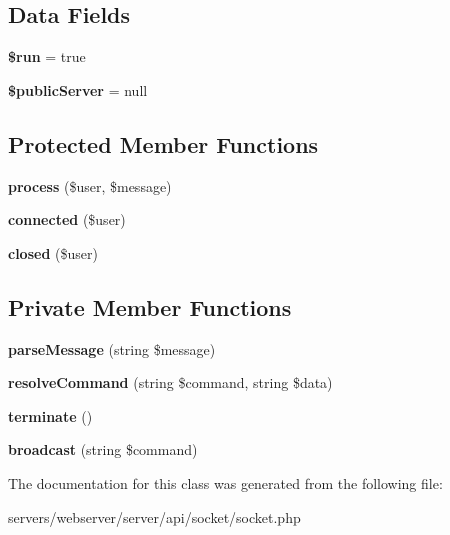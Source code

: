\subsection*{Data Fields}
\begin{DoxyCompactItemize}
\item 
\mbox{\label{class_lora_1_1_api_1_1_control_server_a1d6ddc9c52e0994f2ec85eb34cc1b1cf}} 
{\bfseries \$run} = true
\item 
\mbox{\label{class_lora_1_1_api_1_1_control_server_a2543b9ff8834fe7f10c97240667dd121}} 
{\bfseries \$public\+Server} = null
\end{DoxyCompactItemize}
\subsection*{Protected Member Functions}
\begin{DoxyCompactItemize}
\item 
\mbox{\label{class_lora_1_1_api_1_1_control_server_a805b6933fa0b69978e35fe94f3884de7}} 
{\bfseries process} (\$user, \$message)
\item 
\mbox{\label{class_lora_1_1_api_1_1_control_server_a3e89014762456a67edbe843811c78736}} 
{\bfseries connected} (\$user)
\item 
\mbox{\label{class_lora_1_1_api_1_1_control_server_aaf6375ec8ee41584a5adcf3d85d73018}} 
{\bfseries closed} (\$user)
\end{DoxyCompactItemize}
\subsection*{Private Member Functions}
\begin{DoxyCompactItemize}
\item 
\mbox{\label{class_lora_1_1_api_1_1_control_server_a14e8d4dad46db8bbfe6c8810a88cf155}} 
{\bfseries parse\+Message} (string \$message)
\item 
\mbox{\label{class_lora_1_1_api_1_1_control_server_ae6fb713e4c2900de8c57b949020384c3}} 
{\bfseries resolve\+Command} (string \$command, string \$data)
\item 
\mbox{\label{class_lora_1_1_api_1_1_control_server_aae6d2f0ed43d77087c71ffd4919dcf5d}} 
{\bfseries terminate} ()
\item 
\mbox{\label{class_lora_1_1_api_1_1_control_server_ab671527a81a457e51152cc532c716faa}} 
{\bfseries broadcast} (string \$command)
\end{DoxyCompactItemize}


The documentation for this class was generated from the following file\+:\begin{DoxyCompactItemize}
\item 
servers/webserver/server/api/socket/socket.\+php\end{DoxyCompactItemize}

